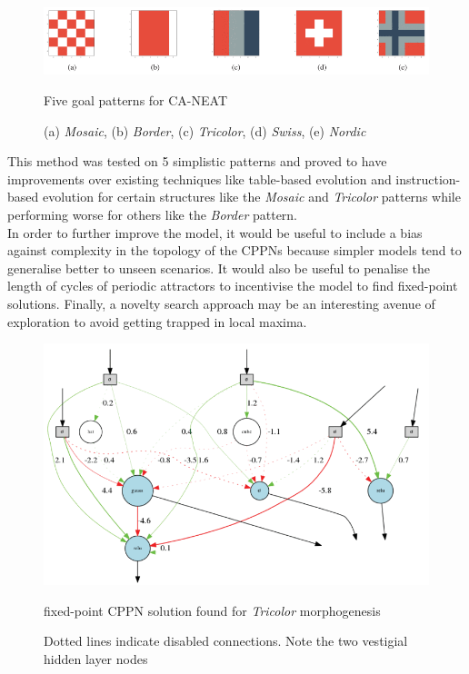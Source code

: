 \begin{figure}[!h]
    \centering
    \includegraphics[width=5in]{images/five-flags.png}
    \caption{Five goal patterns for CA-NEAT}
    \caption*{(a) \textit{Mosaic}, (b) \textit{Border}, (c) \textit{Tricolor}, (d) \textit{Swiss}, (e) \textit{Nordic}}
    \label{fig:five-flags}
\end{figure}

This method was tested on 5 simplistic patterns and proved to have improvements over existing techniques like table-based evolution and instruction-based evolution \cite{nichele2014evolutionary} for certain structures like the \textit{Mosaic} and \textit{Tricolor} patterns while performing worse for others like the \textit{Border} pattern.\\

In order to further improve the model, it would be useful to include a bias against complexity in the topology of the CPPNs because simpler models tend to generalise better to unseen scenarios.
It would also be useful to penalise the length of cycles of periodic attractors to incentivise the model to find fixed-point solutions.
Finally, a novelty search approach may be an interesting avenue of exploration to avoid getting trapped in local maxima.

\begin{figure}[!h]
    \centering
    \includegraphics[width=5in]{images/tricolor-cppn.png}
    \caption{fixed-point CPPN solution found for \textit{Tricolor} morphogenesis}
    \caption*{Dotted lines indicate disabled connections. Note the two vestigial hidden layer nodes}
    \label{fig:tricolor-cppn}
\end{figure}


